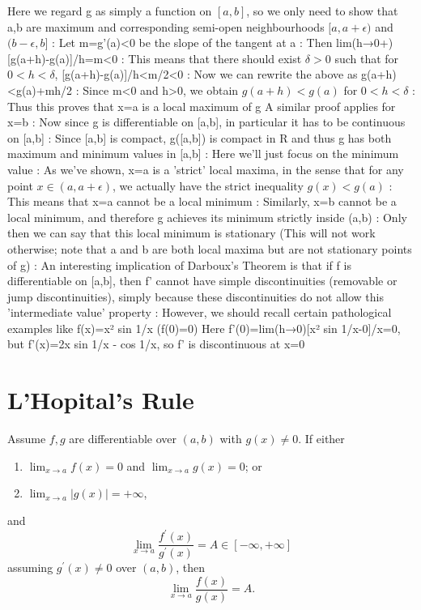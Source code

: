 Here we regard g as simply a function on $[a,b]$, so we only need to show that a,b are maximum and corresponding semi-open neighbourhoods $[a,a+\epsilon)$ and $(b-\epsilon,b]$
:
Let m=g'(a)<0 be the slope of the tangent at a
:
Then lim(h→0+)[g(a+h)-g(a)]/h=m<0
:
This means that there should exist $\delta>0$ such that for $0<h<\delta$, [g(a+h)-g(a)]/h<m/2<0
:
Now we can rewrite the above as
g(a+h)<g(a)+mh/2
:
Since m<0 and h>0, we obtain
$g(a+h)<g(a)$ for $0<h<\delta$
:
Thus this proves that x=a is a local maximum of g
A similar proof applies for x=b
:
Now since g is differentiable on [a,b], in particular it has to be continuous on [a,b]
:
Since [a,b] is compact, g([a,b]) is compact in R and thus g has both maximum and minimum values in [a,b]
:
Here we'll just focus on the minimum value
:
As we've shown, x=a is a 'strict' local maxima, in the sense that for any point $x\in(a,a+\epsilon)$, we actually have the strict inequality $g(x)<g(a)$
:
This means that x=a cannot be a local minimum
:
Similarly, x=b cannot be a local minimum, and therefore g achieves its minimum strictly inside (a,b)
:
Only then we can say that this local minimum is stationary
(This will not work otherwise; note that a and b are both local maxima but are not stationary points of g)
:
An interesting implication of Darboux's Theorem is that if f is differentiable on [a,b], then f' cannot have simple discontinuities (removable or jump discontinuities), simply because these discontinuities do not allow this 'intermediate value' property
:
However, we should recall certain pathological examples like f(x)=x² sin 1/x (f(0)=0)
Here f'(0)=lim(h→0)[x² sin 1/x-0]/x=0, but f'(x)=2x sin 1/x - cos 1/x, so f' is discontinuous at x=0

\section{L'Hopital's Rule}
\begin{theorem}
Assume $f,g$ are differentiable over $(a,b)$ with $g(x)\neq0$. If either
\begin{enumerate}[label=(\arabic*)]
\item $\lim_{x\to a}f(x)=0$ and $\lim_{x\to a}g(x)=0$; or
\item $\lim_{x\to a}|g(x)|=+\infty$,
\end{enumerate}
and
\[\lim_{x\to a}\frac{f^\prime(x)}{g^\prime(x)}=A\in[-\infty,+\infty]\]
assuming $g^\prime(x)\neq0$ over $(a,b)$, then
\[\lim_{x\to a}\frac{f(x)}{g(x)}=A.\]
\end{theorem}

